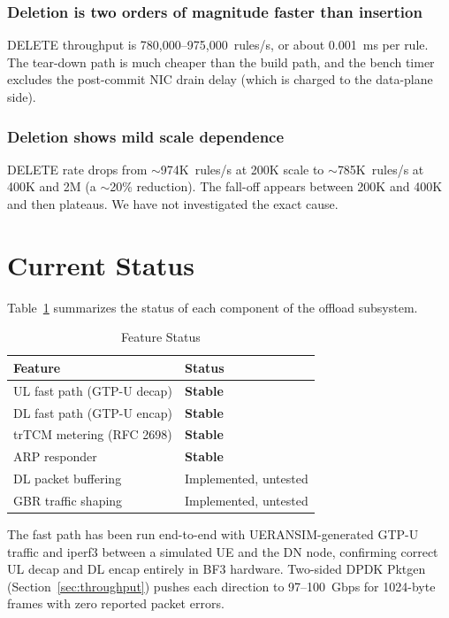 \documentclass[conference]{IEEEtran}
\begin{document}
\subsubsection{Deletion is two orders of magnitude faster than insertion}
DELETE throughput is 780{,}000--975{,}000~rules/s, or about 0.001~ms
per rule.  The tear-down path is much cheaper than the build path, and
the bench timer excludes the post-commit NIC drain delay (which is
charged to the data-plane side).

\subsubsection{Deletion shows mild scale dependence}
DELETE rate drops from $\sim$974K~rules/s at 200K scale to
$\sim$785K~rules/s at 400K and 2M (a $\sim$20\% reduction).  The
fall-off appears between 200K and 400K and then plateaus.  We have not
investigated the exact cause.

\section{Current Status}

Table~\ref{tab:status} summarizes the status of each component of
the offload subsystem.

\begin{table}[!h]
  \centering
  \caption{Feature Status}
  \label{tab:status}
  \begin{tabular}{@{}ll@{}}
    \toprule
    Feature                     & Status \\
    \midrule
    UL fast path (GTP-U decap)  & \textbf{Stable} \\
    DL fast path (GTP-U encap)  & \textbf{Stable} \\
    trTCM metering (RFC 2698)   & \textbf{Stable} \\
    ARP responder               & \textbf{Stable} \\
    DL packet buffering         & Implemented, untested \\
    GBR traffic shaping         & Implemented, untested \\
    \bottomrule
  \end{tabular}
\end{table}

The fast path has been run end-to-end with UERANSIM-generated GTP-U
traffic and iperf3 between a simulated UE and the DN node, confirming
correct UL decap and DL encap entirely in BF3 hardware.  Two-sided
DPDK Pktgen (Section~\ref{sec:throughput}) pushes each direction to
97--100~Gbps for 1024-byte frames with zero reported packet errors.
\end{document}
